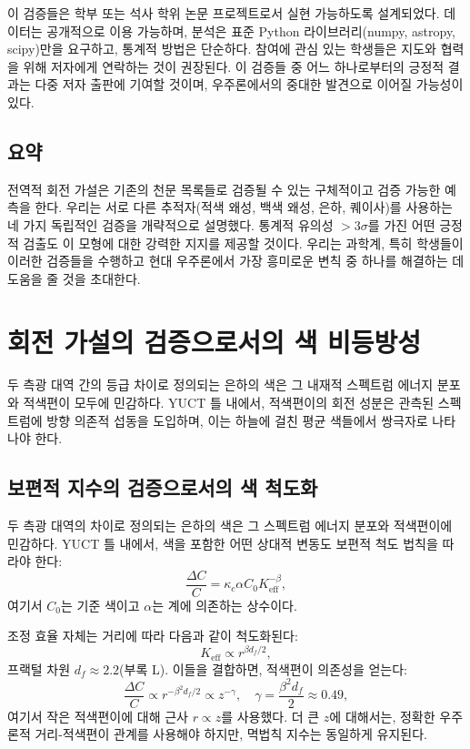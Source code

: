 \documentclass[11pt,a4paper]{article}
\begin{document}
	이 검증들은 학부 또는 석사 학위 논문 프로젝트로서 실현 가능하도록 설계되었다. 데이터는 공개적으로 이용 가능하며, 분석은 표준 Python 라이브러리(numpy, astropy, scipy)만을 요구하고, 통계적 방법은 단순하다. 참여에 관심 있는 학생들은 지도와 협력을 위해 저자에게 연락하는 것이 권장된다. 이 검증들 중 어느 하나로부터의 긍정적 결과는 다중 저자 출판에 기여할 것이며, 우주론에서의 중대한 발견으로 이어질 가능성이 있다.
	
	\subsection{요약}
	
	전역적 회전 가설은 기존의 천문 목록들로 검증될 수 있는 구체적이고 검증 가능한 예측을 한다. 우리는 서로 다른 추적자(적색 왜성, 백색 왜성, 은하, 퀘이사)를 사용하는 네 가지 독립적인 검증을 개략적으로 설명했다. 통계적 유의성 \(>3\sigma\)를 가진 어떤 긍정적 검출도 이 모형에 대한 강력한 지지를 제공할 것이다. 우리는 과학계, 특히 학생들이 이러한 검증들을 수행하고 현대 우주론에서 가장 흥미로운 변칙 중 하나를 해결하는 데 도움을 줄 것을 초대한다.
	
	\section{회전 가설의 검증으로서의 색 비등방성}
	
	두 측광 대역 간의 등급 차이로 정의되는 은하의 색은 그 내재적 스펙트럼 에너지 분포와 적색편이 모두에 민감하다. YUCT 틀 내에서, 적색편이의 회전 성분은 관측된 스펙트럼에 방향 의존적 섭동을 도입하며, 이는 하늘에 걸친 평균 색들에서 쌍극자로 나타나야 한다.
	
	\subsection{보편적 지수의 검증으로서의 색 척도화}
	
	두 측광 대역의 차이로 정의되는 은하의 색은 그 스펙트럼 에너지 분포와 적색편이에 민감하다. YUCT 틀 내에서, 색을 포함한 어떤 상대적 변동도 보편적 척도 법칙을 따라야 한다:
	\begin{equation}
		\frac{\Delta C}{C} = \kappa_c \alpha C_0 K_{\mathrm{eff}}^{-\beta},
	\end{equation}
	여기서 \(C_0\)는 기준 색이고 \(\alpha\)는 계에 의존하는 상수이다.
	
	조정 효율 자체는 거리에 따라 다음과 같이 척도화된다:
	\begin{equation}
		K_{\mathrm{eff}} \propto r^{\beta d_f / 2},
	\end{equation}
	프랙털 차원 \(d_f \approx 2.2\)(부록 L). 이들을 결합하면, 적색편이 의존성을 얻는다:
	\begin{equation}
		\frac{\Delta C}{C} \propto r^{-\beta^2 d_f / 2} \propto z^{-\gamma}, \quad \gamma = \frac{\beta^2 d_f}{2} \approx 0.49,
	\end{equation}
	여기서 작은 적색편이에 대해 근사 \(r \propto z\)를 사용했다. 더 큰 \(z\)에 대해서는, 정확한 우주론적 거리-적색편이 관계를 사용해야 하지만, 멱법칙 지수는 동일하게 유지된다.
	
\end{document}
